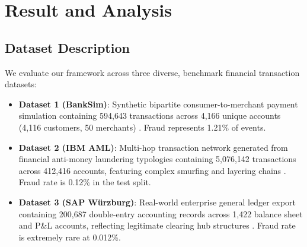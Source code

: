 \section{Result and Analysis}\label{sec:results}

\subsection{Dataset Description}\label{sec:dataset_desc}
We evaluate our framework across three diverse, benchmark financial transaction datasets:
\begin{itemize}
    \item \textbf{Dataset 1 (BankSim)}: Synthetic bipartite consumer-to-merchant payment simulation containing 594,643 transactions across 4,166 unique accounts (4,116 customers, 50 merchants) \cite{lopez2016banksim}. Fraud represents 1.21\% of events.
    \item \textbf{Dataset 2 (IBM AML)}: Multi-hop transaction network generated from financial anti-money laundering typologies containing 5,076,142 transactions across 412,416 accounts, featuring complex smurfing and layering chains \cite{weber2019antimoney}. Fraud rate is 0.12\% in the test split.
    \item \textbf{Dataset 3 (SAP W\"urzburg)}: Real-world enterprise general ledger export containing 200,687 double-entry accounting records across 1,422 balance sheet and P\&L accounts, reflecting legitimate clearing hub structures \cite{schreyer2020detection}. Fraud rate is extremely rare at 0.012\%.
\end{itemize}

